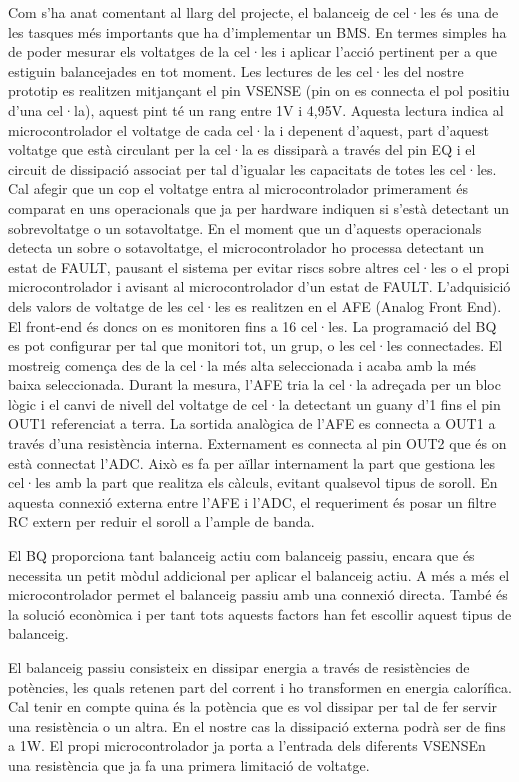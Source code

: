 Com s'ha anat comentant al llarg del projecte, el balanceig de cel·les és una de les tasques més importants que ha d'implementar un BMS. En termes simples ha de poder mesurar els voltatges de la cel·les i aplicar l'acció pertinent per a que estiguin balancejades en tot moment. Les lectures de les cel·les del nostre prototip es realitzen mitjançant el pin VSENSE (pin on es connecta el pol positiu d'una cel·la), aquest pint té un rang entre 1V i 4,95V. Aquesta lectura indica al microcontrolador el voltatge de cada cel·la i depenent d'aquest, part d'aquest voltatge que està circulant per la cel·la es dissiparà a través del pin EQ i el circuit de dissipació associat per tal d'igualar les capacitats de totes les cel·les. Cal afegir que un cop el voltatge entra al microcontrolador primerament és comparat en uns operacionals que ja per hardware indiquen si s'està detectant un sobrevoltatge o un sotavoltatge. En el moment que un d'aquests operacionals detecta un sobre o sotavoltatge, el microcontrolador ho processa detectant un estat de FAULT, pausant el sistema per evitar riscs sobre altres cel·les o el propi microcontrolador i avisant al microcontrolador d'un estat de FAULT. 
L'adquisició dels valors de voltatge de les cel·les es realitzen en el AFE (Analog Front End). El front-end és doncs on es monitoren fins a 16 cel·les. La programació del BQ es pot configurar per tal que monitori tot, un grup, o les cel·les connectades. El mostreig comença des de la cel·la més alta seleccionada i acaba amb la més baixa seleccionada. Durant la mesura, l'AFE tria la cel·la adreçada per un bloc lògic i el canvi de nivell del voltatge de cel·la detectant un guany d'1 fins el pin OUT1 referenciat a terra. La sortida analògica de l'AFE es connecta a OUT1 a través d'una resistència interna. Externament es connecta al pin OUT2 que és on està connectat l'ADC. Això es fa per aïllar internament la part que gestiona les cel·les amb la part que realitza els càlculs, evitant qualsevol tipus de soroll. En aquesta connexió externa entre l'AFE i l'ADC, el requeriment és posar un filtre RC extern per reduir el soroll a l'ample de banda.

 El BQ proporciona tant balanceig actiu com balanceig passiu, encara que és necessita un petit mòdul addicional per aplicar el balanceig actiu. A més a més el microcontrolador permet el balanceig passiu amb una connexió directa. També és la solució econòmica i per tant tots aquests factors han fet escollir aquest tipus de balanceig. 
 
 El balanceig passiu consisteix en dissipar energia a través de resistències de potències, les quals retenen part del corrent i ho transformen en energia calorífica. Cal tenir en compte quina és la potència que es vol dissipar per tal de fer servir una resistència o un altra. En el nostre cas la dissipació externa podrà ser de fins a 1W. El propi microcontrolador ja porta a l'entrada dels diferents VSENSEn una resistència que ja fa una primera limitació de voltatge.
 
